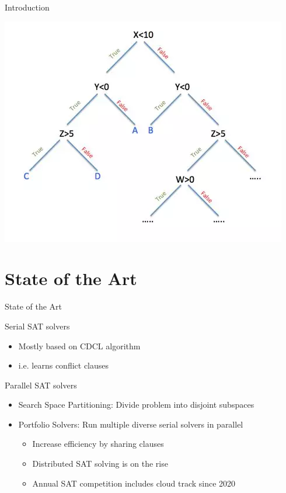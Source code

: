 \documentclass[]{sdqbeamer}
\begin{document}
\begin{frame}{Introduction}
\begin{minipage}{.45\textwidth}
        \includegraphics[scale=.35]{images/decition_tree.png}
    \end{minipage}
\end{frame}


\section{State of the Art}
\begin{frame}{State of the Art}
    \begin{block}{Serial SAT solvers}
        \begin{itemize}
            \item Mostly based on CDCL algorithm
            \item i.e. learns conflict clauses
        \end{itemize}
    \end{block}

    \begin{block}{Parallel SAT solvers}
        \begin{itemize}
            \item Search Space Partitioning: Divide problem into disjoint subspaces
            \item Portfolio Solvers: Run multiple diverse serial solvers in parallel
            \begin{itemize}
                \item Increase efficiency by sharing clauses
                \item Distributed SAT solving is on the rise
                \item Annual SAT competition includes cloud track since 2020
            \end{itemize}
        \end{itemize}
    \end{block}
\end{frame}
\end{document}

